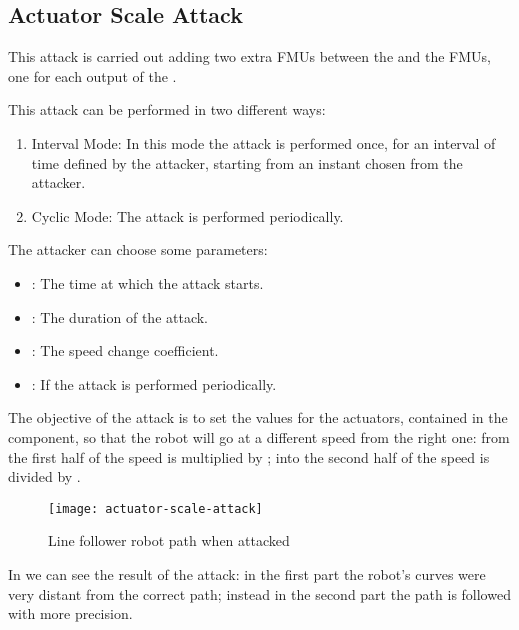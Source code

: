 \subsection{Actuator Scale Attack}
This attack is carried out adding two extra FMUs between the 
and the  FMUs, one for each output of the .

This attack can be performed in two different ways:
\begin{enumerate}
	\item Interval Mode: In this mode the attack is performed once, for an
		interval of time defined by the attacker, starting from an
		instant chosen from the attacker.
	\item Cyclic Mode: The attack is performed periodically.
\end{enumerate}

The attacker can choose some parameters:
\begin{itemize}
	\item {}: The time at which the attack starts.
	\item {}: The duration of the attack.
	\item {}: The speed change coefficient.
	\item {}: If  the attack is performed
		periodically.
\end{itemize}

The objective of the attack is to set the values for the actuators, contained in
the  component, so that the robot will go at a different speed from
the right one: from the first half of  the speed is
multiplied by ; into the second half of
 the speed is divided by .



\begin{figure}[htb]
	\centering
	\texttt{[image: actuator-scale-attack]}
	\caption{Line follower robot path when
	attacked}\label{fig:actuatorscaleresult}
\end{figure}

In  we can see the result of the attack: in the
first part the robot's curves were very distant from the correct path; instead
in the second part the path is followed with more precision.
